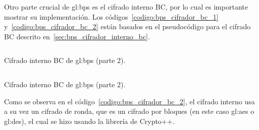 Otro parte crucial de \gls{gl:bps} es el cifrado interno BC, por lo cual es
importante mostrar su implementación. Los códigos~\ref{codigo:bps_cifrador_bc_1}
y~\ref{codigo:bps_cifrador_bc_2} están basados en el pseudocódigo para el
cifrado BC descrito en~\ref{sec:bps_cifrador_interno_bc}.

\begin{listing}
  \inputminted[firstline=111, lastline=165]
    {c++}{../implementaciones/bps/cifrador_BC.cpp}
  \caption{Cifrado interno BC de  \gls{gl:bps} (parte 2).}
  \label{codigo:bps_cifrador_bc_1}
\end{listing}

\begin{listing}
  \inputminted[firstline=165, lastline=218]
    {c++}{../implementaciones/bps/cifrador_BC.cpp}
  \caption{Cifrado interno BC de  \gls{gl:bps} (parte 2).}
  \label{codigo:bps_cifrador_bc_2}
\end{listing}

Como se observa en el código~\ref{codigo:bps_cifrador_bc_2}, el cifrado
interno usa a su vez un cifrado de ronda, que es un cifrado por bloques
(en este caso \gls{gl:aes} o \gls{gl:des}), el cual se hizo usando la
librería de Crypto++.
